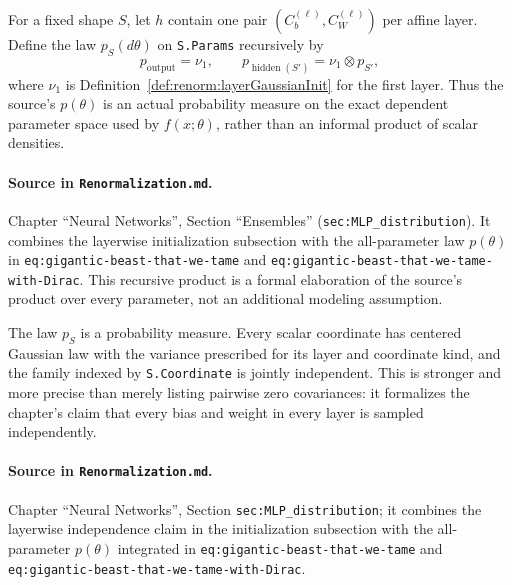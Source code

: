 \begin{definition}
\label{def:renorm:mlpGaussianInit}
For a fixed shape $S$, let $h$ contain one pair $(C_b^{(\ell)},C_W^{(\ell)})$ per affine layer.
Define the law $p_S(d\theta)$ on \texttt{S.Params} recursively by
\[
 p_{\operatorname{output}}=\nu_1,
 \qquad
 p_{\operatorname{hidden}(S')}=\nu_1\otimes p_{S'},
\]
where $\nu_1$ is Definition~\ref{def:renorm:layerGaussianInit} for the first layer.  Thus the source's
$p(\theta)$ is an actual probability measure on the exact dependent parameter space used by
$f(x;\theta)$, rather than an informal product of scalar densities.

\paragraph{Source in \texttt{Renormalization.md}.}
Chapter ``Neural Networks'', Section ``Ensembles'' (\texttt{sec:MLP\_distribution}).  It combines the
layerwise initialization subsection with the all-parameter law $p(\theta)$ in
\texttt{eq:gigantic-beast-that-we-tame} and
\texttt{eq:gigantic-beast-that-we-tame-with-Dirac}.  This recursive product is a formal elaboration
of the source's product over every parameter, not an additional modeling assumption.
\end{definition}

\begin{theorem}
\label{thm:renorm:mlpGaussianInitCoordinates}
The law $p_S$ is a probability measure.  Every scalar coordinate has centered Gaussian law with
the variance prescribed for its layer and coordinate kind, and the family indexed by
\texttt{S.Coordinate} is jointly independent.  This is stronger and more precise than merely listing
pairwise zero covariances: it formalizes the chapter's claim that every bias and weight in every
layer is sampled independently.

\paragraph{Source in \texttt{Renormalization.md}.}
Chapter ``Neural Networks'', Section \texttt{sec:MLP\_distribution}; it combines the layerwise
independence claim in the initialization subsection with the all-parameter $p(\theta)$ integrated in
\texttt{eq:gigantic-beast-that-we-tame} and
\texttt{eq:gigantic-beast-that-we-tame-with-Dirac}.
\end{theorem}

